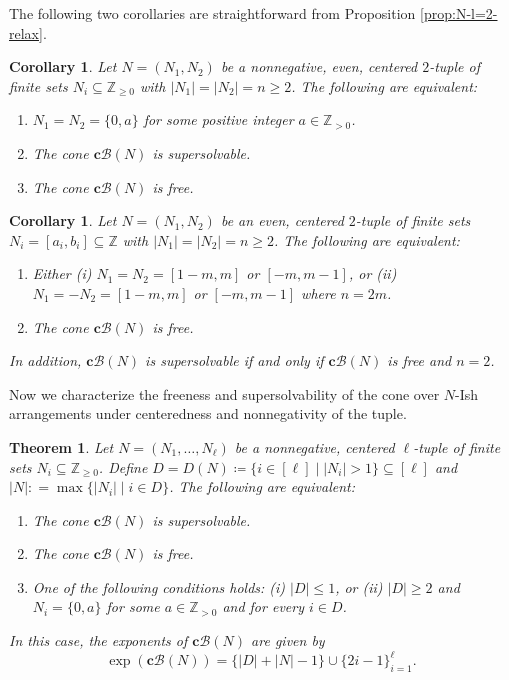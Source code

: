 \documentclass[11pt]{article}
\newtheorem{corollary}[theo]{Corollary}
\newtheorem{theorem}[theo]{Theorem}
\theoremstyle{definition}
\numberwithin{equation}{section}
\newcommand{\B}{\mathcal{B}}
\newcommand{\Z}{\mathbb{Z}}
\newcommand{\tbf}{\textbf}
\begin{document}
The following two corollaries are straightforward from Proposition \ref{prop:N-l=2-relax}.
 \begin{corollary}
 \label{cor:N-l=2-nonnegative}
 Let $N = (N_1, N_2)$ be  a nonnegative, even, centered $2$-tuple  of finite sets $N_i \subseteq \Z_{\ge0}$  with $|N_1| = |N_2|=n \ge 2$.
 The following are equivalent:
 \begin{enumerate}[(1)]
\item $N_1 = N_2 =\{0,a\}$ for some positive integer $a \in \Z_{>0}$.
\item  The cone $\tbf{c}\B(N)$ is supersolvable.
\item The cone $\tbf{c}\B(N)$  is  free.
\end{enumerate}
\end{corollary}

 \begin{corollary}
 \label{cor:N-l=2-integral}
 Let $N = (N_1, N_2)$ be  an even, centered $2$-tuple  of finite sets $N_i =[a_i,b_i] \subseteq \Z$ with $|N_1| = |N_2|=n \ge 2$.
 The following are equivalent:
 \begin{enumerate}[(1)]
\item Either (i) $N_1 = N_2 =[1-m,m]$ or $[-m,m-1]$, or (ii) $N_1 = -N_2 =[1-m,m]$ or $[-m,m-1]$ where $n=2m$.
\item The cone $\tbf{c}\B(N)$  is  free.
\end{enumerate}
In addition, $\tbf{c}\B(N)$ is supersolvable if and only if $\tbf{c}\B(N)$ is free and $n= 2$. 
\end{corollary}




Now we characterize the freeness and supersolvability of the cone over $N$-Ish arrangements under centeredness and nonnegativity of  the tuple.


 \begin{theorem}
 \label{thm:N-Ish-B-free-SS-relax}
 Let $N = (N_1, \ldots, N_\ell)$ be a nonnegative, centered $\ell$-tuple  of finite sets $N_i \subseteq \Z_{\ge0}$. 
 Define $D=D(N) \coloneqq  \{i \in [\ell] \mid |N_i|>1\} \subseteq  [\ell]$ and $|N|: = \max \{  |N_i| \mid i \in D\}$.
 The following are equivalent:
 \begin{enumerate}[(1)]
\item  The cone $\tbf{c}\B(N)$ is supersolvable.
\item The cone $\tbf{c}\B(N)$  is  free.
\item One of the following conditions holds: (i) $| D | \le 1 $, or (ii)  $|D|\ge 2$ and $N_i= \{0,a\}$ for some $a \in \Z_{>0}$ and for every $i \in D$. 
\end{enumerate}
In this case, the exponents of  $\tbf{c}\B(N)$ are given by 
$$\exp(\tbf{c}\B(N)) = \{|D|+|N| -1\} \cup \{2i-1\}_{i=1}^\ell.$$ 
 \end{theorem}
 
\end{document}
